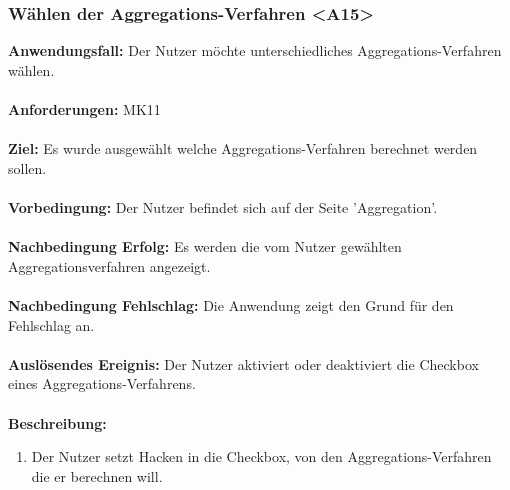 \documentclass[parskip=full]{scrartcl} %
\begin{document}
\subsubsection*{Wählen der Aggregations-Verfahren <A15>}
\textbf{Anwendungsfall:} Der Nutzer möchte unterschiedliches Aggregations-Verfahren wählen.\\\\
\textbf{Anforderungen:} MK11\\\\
\textbf{Ziel:} Es wurde ausgewählt welche Aggregations-Verfahren berechnet werden sollen.\\\\
\textbf{Vorbedingung:} Der Nutzer befindet sich auf der Seite 'Aggregation'.\\\\
\textbf{Nachbedingung Erfolg:} Es werden die vom Nutzer gewählten Aggregationsverfahren angezeigt.\\\\
\textbf{Nachbedingung Fehlschlag:} Die Anwendung zeigt den Grund für den Fehlschlag an. \\\\
\textbf{Auslösendes Ereignis:} Der Nutzer aktiviert oder deaktiviert die Checkbox eines Aggregations-Verfahrens. \\\\
\textbf{Beschreibung:}
\begin{enumerate}
    \item Der Nutzer setzt Hacken in die Checkbox, von den Aggregations-Verfahren die er berechnen will.
\end{enumerate}
\newpage
\end{document}
